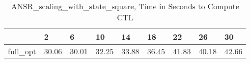 \begin{table}
\caption{ANSR\_scaling\_with\_state\_square, Time in Seconds to Compute CTL}
\label{ANSR_scaling_with_state_square_CTL_time}
\begin{tabular}{lllllllll}
\toprule
 & 2 & 6 & 10 & 14 & 18 & 22 & 26 & 30 \\
\midrule
full\_opt & 30.06 & 30.01 & 32.25 & 33.88 & 36.45 & 41.83 & 40.18 & 42.66 \\
\bottomrule
\end{tabular}
\end{table}
